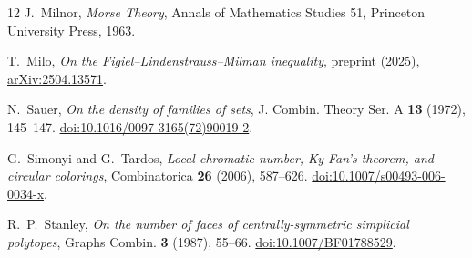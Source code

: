 \documentclass[11pt]{article}
\theoremstyle{remark}
\begin{document}
\begin{thebibliography}{12}
J.~Milnor, \emph{Morse Theory}, Annals of Mathematics Studies 51,
Princeton University Press, 1963.

T.~Milo, \emph{On the Figiel--Lindenstrauss--Milman inequality},
preprint (2025),
\href{https://arxiv.org/abs/2504.13571}{arXiv:2504.13571}.

N.~Sauer,
\emph{On the density of families of sets},
J. Combin. Theory Ser. A \textbf{13} (1972), 145--147.
\href{https://doi.org/10.1016/0097-3165(72)90019-2}{doi:10.1016/0097-3165(72)90019-2}.

G.~Simonyi and G.~Tardos,
\emph{Local chromatic number, Ky Fan's theorem, and circular colorings},
Combinatorica \textbf{26} (2006), 587--626.
\href{https://doi.org/10.1007/s00493-006-0034-x}{doi:10.1007/s00493-006-0034-x}.

R.~P.~Stanley,
\emph{On the number of faces of centrally-symmetric simplicial polytopes},
Graphs Combin. \textbf{3} (1987), 55--66.
\href{https://doi.org/10.1007/BF01788529}{doi:10.1007/BF01788529}.

\end{thebibliography}
\end{document}

